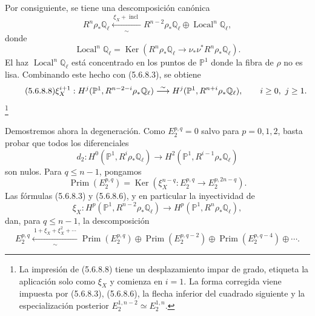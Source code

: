\pageoriginale

Por consiguiente, se tiene una descomposición canónica
\begin{equation}\tag{5.6.8.6}
R^n\rho_*\mathbb Q_\ell
\xleftarrow[\sim]{\ \xi_X+\operatorname{incl}\ }
R^{n-2}\rho_*\mathbb Q_\ell\oplus
\operatorname{Local}^n\mathbb Q_\ell,
\end{equation}
donde
\begin{equation}\tag{5.6.8.7}
\operatorname{Local}^n\mathbb Q_\ell
=\operatorname{Ker}\!\left(
R^n\rho_*\mathbb Q_\ell
\longrightarrow\nu_*\nu^*R^n\rho_*\mathbb Q_\ell
\right).
\end{equation}
El haz $\operatorname{Local}^n\mathbb Q_\ell$ está concentrado en los
puntos de $\mathbb P^1$ donde la fibra de $\rho$ no es lisa.
Combinando este hecho con (5.6.8.3), se obtiene
\begin{equation}\tag{5.6.8.8}
\xi_X^{\sisi{1}{i+1}}:
H^j(\mathbb P^1,R^{n-2-i}\rho_*\mathbb Q_\ell)
\overset{\sim}{\longrightarrow}
H^j(\mathbb P^1,R^{\sisi{n-1+i}{n+i}}\rho_*\mathbb Q_\ell),
\qquad \sisi{i\geq1,\ j\geq1}{i\geq0,\ j\geq1}.
\end{equation}
\footnote{La impresión de (5.6.8.8) tiene un desplazamiento impar de
grado, etiqueta la aplicación solo como $\xi_X$ y comienza en $i=1$.
La forma corregida viene impuesta por (5.6.8.3), (5.6.8.6), la flecha
inferior del cuadrado siguiente y la especialización posterior
$E_2^{1,n-2}\simeq E_2^{1,n}$.}

Demostremos ahora la degeneración. Como $E_2^{p,q}=0$ salvo para
$p=0,1,2$, basta probar que todos los diferenciales
\[
d_2:H^0(\mathbb P^1,R^i\rho_*\mathbb Q_\ell)
\longrightarrow H^2(\mathbb P^1,R^{i-1}\rho_*\mathbb Q_\ell)
\]
son nulos. Para $q\leq n-1$, pongamos
\begin{equation}\tag{5.6.8.9}
\operatorname{Prim}(E_2^{p,q})
=\operatorname{Ker}\!\left(
\xi_X^{n-q}:E_2^{p,q}\longrightarrow E_2^{p,2n-q}
\right).
\end{equation}
Las fórmulas (5.6.8.3) y (5.6.8.6), y en particular la inyectividad de
\[
\xi_X:H^p(\mathbb P^1,R^{n-2}\rho_*\mathbb Q_\ell)
\longrightarrow H^p(\mathbb P^1,R^n\rho_*\mathbb Q_\ell),
\]
dan, para $q\leq n-1$, la descomposición
\begin{equation}\tag{5.6.8.10}
E_2^{p,q}
\xleftarrow[\sim]{\ 1+\xi_X+\xi_X^2+\cdots\ }
\operatorname{Prim}(E_2^{p,q})
\oplus\operatorname{Prim}(E_2^{p,q-2})
\oplus\operatorname{Prim}(E_2^{p,q-4})
\oplus\cdots.
\end{equation}

